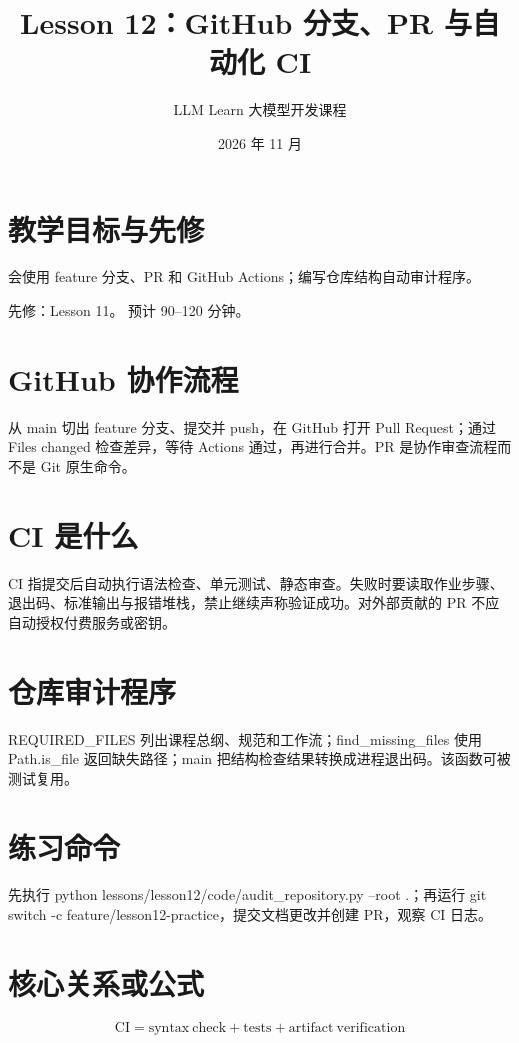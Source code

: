\documentclass[UTF8,11pt,a4paper]{ctexart}
\begin{document}
\title{Lesson 12：GitHub 分支、PR 与自动化 CI}
\author{LLM Learn 大模型开发课程}
\date{2026 年 11 月}
\maketitle
\tableofcontents
\newpage
\section{教学目标与先修}
会使用 feature 分支、PR 和 GitHub Actions；编写仓库结构自动审计程序。\par
先修：Lesson 11。 预计 90–120 分钟。\par
\section{GitHub 协作流程}
从 main 切出 feature 分支、提交并 push，在 GitHub 打开 Pull Request；通过 Files changed 检查差异，等待 Actions 通过，再进行合并。PR 是协作审查流程而不是 Git 原生命令。

\section{CI 是什么}
CI 指提交后自动执行语法检查、单元测试、静态审查。失败时要读取作业步骤、退出码、标准输出与报错堆栈，禁止继续声称验证成功。对外部贡献的 PR 不应自动授权付费服务或密钥。

\section{仓库审计程序}
REQUIRED\_FILES 列出课程总纲、规范和工作流；find\_missing\_files 使用 Path.is\_file 返回缺失路径；main 把结构检查结果转换成进程退出码。该函数可被测试复用。

\section{练习命令}
先执行 python lessons/lesson12/code/audit\_repository.py --root .；再运行 git switch -c feature/lesson12-practice，提交文档更改并创建 PR，观察 CI 日志。

\section{核心关系或公式}
\[
\mathrm{CI}=\mathrm{syntax\ check}+\mathrm{tests}+\mathrm{artifact\ verification}
\]
\end{document}
